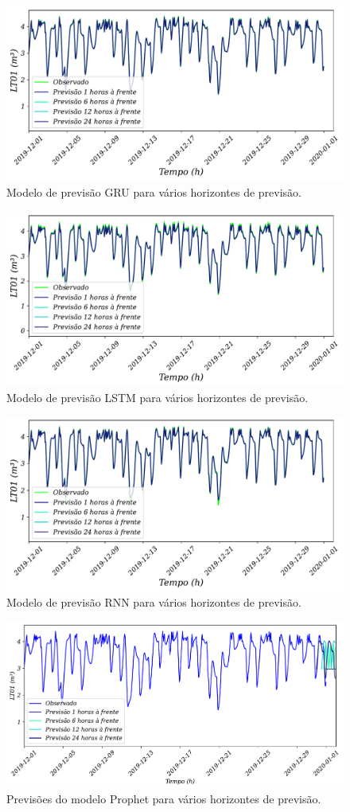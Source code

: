 \begin{figure}[!htb]
	\centering
	\caption{Modelo de previsão GRU para vários horizontes de previsão.}
	\label{fig:gru1}
	\includegraphics[width=0.7\linewidth]{Resultados/Figuras/GRU}
	
\end{figure}

\begin{figure}[!htb]
	\centering
	\caption{Modelo de previsão LSTM para vários horizontes de previsão.}
	\label{fig:lstm}
	\includegraphics[width=0.7\linewidth]{Resultados/Figuras/LSTM}
	
\end{figure}

\begin{figure}[!htb]
	\centering
	\caption{Modelo de previsão RNN para vários horizontes de previsão.}
	\label{fig:rnn}
	\includegraphics[width=0.7\linewidth]{Resultados/Figuras/RNN}
\end{figure}
\begin{figure}[!htb]
	\centering
	\caption{Previsões do modelo Prophet para vários horizontes de previsão.}\label{fig:prophet1}
	\includegraphics[width=0.7\linewidth]{Resultados/Figuras/prophet}	
\end{figure}


